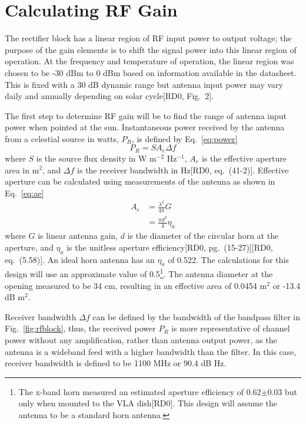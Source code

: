\documentclass[titlepage]{article}
\newcommand{\nraocite}[1]{[RD0\cite{#1}]}
\newcommand{\nraoprecite}[2][]{[RD0\cite{#2}{, #1}]}
\begin{document}
\section{Calculating RF Gain}
The rectifier block has a linear region of RF input power to output voltage; the purpose of the gain elements is to shift the signal power into this linear region of operation. At the frequency and temperature of operation, the linear region was chosen to be -30 dBm to 0 dBm based on information available in the datasheet. This is fixed with a 30 dB dynamic range but antenna input power may vary daily and annually depending on solar cycle\nraoprecite[Fig.~2]{solartemp}.

The first step to determine RF gain will be to find the range of antenna input power when pointed at the sun. Instantaneous power received by the antenna from a celestial source in watts, $P_R$, is defined by Eq.~\ref{eq:power}
\begin{equation}
    P_R = S A_e \Delta f
\label{eq:power}
\end{equation}
where $S$ is the source flux density in W m$^{-2}$ Hz$^{-1}$, $A_e$ is the effective aperture area in m$^2$, and $\Delta f$ is the receiver bandwidth in Hz\nraoprecite[eq.~(41-2)]{aeh}. Effective aperture can be calculated using measurements of the antenna as shown in Eq.~\ref{eq:ae}
\begin{equation} \label{eq:ae}
\begin{split}
    A_e &= \frac{\lambda^2}{4\pi}G \\
    &= \frac{\pi d^2}{4} \eta_a
\end{split}
\end{equation}
where $G$ is linear antenna gain, $d$ is the diameter of the circular horn at the aperture, and $\eta_a$ is the unitless aperture efficiency\nraoprecite[pg.~(15-27)]{aeh}\nraoprecite[eq.~(5.58)]{tora}. An ideal horn antenna has an $\eta_a$ of 0.522. The calculations for this design will use an approximate value of 0.5\footnote{The x-band horn measured an estimated aperture efficiency of 0.62$\pm$0.03 but only when mounted to the VLA dish\nraocite{xbandvla}. This design will assume the antenna to be a standard horn antenna.}. The antenna diameter at the opening measured to be 34 cm, resulting in an effective area of 0.0454 m$^2$ or -13.4 dB m$^2$.

Receiver bandwidth $\Delta f$ can be defined by the bandwidth of the bandpass filter in Fig.~\ref{fig:rfblock}, thus, the received power $P_R$ is more representative of channel power without any amplification, rather than antenna output power, as the antenna is a wideband feed with a higher bandwidth than the filter. In this case, receiver bandwidth is defined to be 1100 MHz or 90.4 dB Hz.
\end{document}

